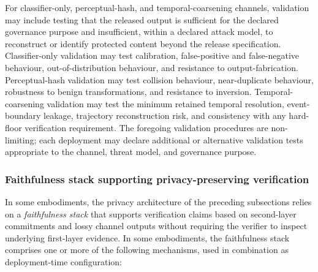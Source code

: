 \documentclass[a4paper,12pt]{article}
\begin{document}
For classifier-only, perceptual-hash, and temporal-coarsening channels,
validation may include testing that the released output is sufficient
for the declared governance purpose and insufficient, within a declared
attack model, to reconstruct or identify protected content beyond the
release specification. Classifier-only validation may test calibration,
false-positive and false-negative behaviour, out-of-distribution
behaviour, and resistance to output-fabrication. Perceptual-hash
validation may test collision behaviour, near-duplicate behaviour,
robustness to benign transformations, and resistance to inversion.
Temporal-coarsening validation may test the minimum retained temporal
resolution, event-boundary leakage, trajectory reconstruction risk,
and consistency with any hard-floor verification requirement. The
foregoing validation procedures are non-limiting; each deployment may
declare additional or alternative validation tests appropriate to the
channel, threat model, and governance purpose.

\subsubsection{Faithfulness stack supporting privacy-preserving
  verification}
\label{sec:privacy-faithfulness}

In some embodiments, the privacy architecture of the preceding
subsections relies on a \emph{faithfulness stack} that supports
verification claims based on second-layer commitments and lossy
channel outputs without requiring the verifier to inspect underlying
first-layer evidence. In some embodiments, the faithfulness stack
comprises one or more of the following mechanisms, used in
combination as deployment-time configuration:
\end{document}
